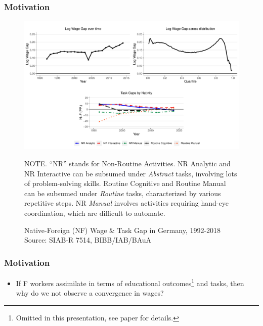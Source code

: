 \documentclass[10pt]{beamer}
\begin{document}
\begin{frame} 
	\frametitle{Motivation}
	
	
	\begin{figure}[H]
		\centering
		\begin{minipage}{0.90\textwidth} %
			\includegraphics[width=0.90\linewidth]{wgap_tgap}
			\caption{  Native-Foreign (NF) Wage \& Task Gap in Germany, 1992-2018 \\ 
				\medskip \centering \tiny Source: SIAB-R 7514, BIBB/IAB/BAuA \label{fig:wage_gap}}
			{\footnotesize \tiny NOTE. \textemdash ``NR'' stands for Non-Routine Activities. NR Analytic and NR Interactive can be subsumed under \textit{Abstract} tasks, involving lots of problem-solving skills. Routine Cognitive and Routine Manual can be subsumed under \textit{Routine} tasks, characterized by various repetitive steps. NR \textit{Manual} involves activities requiring hand-eye coordination, which are difficult to automate.  \par}
		\end{minipage}
	\end{figure}
	

\end{frame}

\begin{frame} 
	\frametitle{Motivation}
	
	
	\begin{itemize}
		\item If F workers assimilate in terms of educational outcomes\footnote[frame]{Omitted in this presentation, see paper for details.} and tasks, then why do we not observe a convergence in wages?
	\end{itemize}
	
\end{frame}
\end{document}
